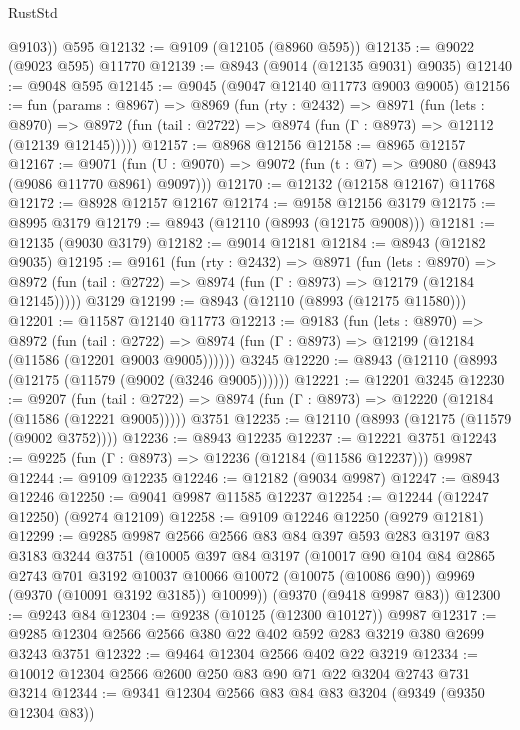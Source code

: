 \begin{lexlean}{RustStd}
\begin{coremodule}
        @9103))
    @595
@12132 := @9109 (@12105 (@8960 @595))
@12135 := @9022 (@9023 @595) @11770
@12139 := @8943 (@9014 (@12135 @9031) @9035)
@12140 := @9048 @595
@12145 := @9045 (@9047 @12140 @11773 @9003 @9005)
@12156 := fun (params : @8967) =>
  @8969
    (fun (rty : @2432) =>
    @8971
      (fun (lets : @8970) =>
      @8972 (fun (tail : @2722) => @8974 (fun (Γ : @8973) => @12112 (@12139 @12145)))))
@12157 := @8968 @12156
@12158 := @8965 @12157
@12167 := @9071
    (fun (U : @9070) => @9072 (fun (t : @7) => @9080 (@8943 (@9086 @11770 @8961) @9097)))
@12170 := @12132 (@12158 @12167) @11768
@12172 := @8928 @12157 @12167
@12174 := @9158 @12156 @3179
@12175 := @8995 @3179
@12179 := @8943 (@12110 (@8993 (@12175 @9008)))
@12181 := @12135 (@9030 @3179)
@12182 := @9014 @12181
@12184 := @8943 (@12182 @9035)
@12195 := @9161
    (fun (rty : @2432) =>
    @8971
      (fun (lets : @8970) =>
      @8972 (fun (tail : @2722) => @8974 (fun (Γ : @8973) => @12179 (@12184 @12145)))))
    @3129
@12199 := @8943 (@12110 (@8993 (@12175 @11580)))
@12201 := @11587 @12140 @11773
@12213 := @9183
    (fun (lets : @8970) =>
    @8972
      (fun (tail : @2722) =>
      @8974 (fun (Γ : @8973) => @12199 (@12184 (@11586 (@12201 @9003 @9005))))))
    @3245
@12220 := @8943 (@12110 (@8993 (@12175 (@11579 (@9002 (@3246 @9005))))))
@12221 := @12201 @3245
@12230 := @9207
    (fun (tail : @2722) => @8974 (fun (Γ : @8973) => @12220 (@12184 (@11586 (@12221 @9005)))))
    @3751
@12235 := @12110 (@8993 (@12175 (@11579 (@9002 @3752))))
@12236 := @8943 @12235
@12237 := @12221 @3751
@12243 := @9225 (fun (Γ : @8973) => @12236 (@12184 (@11586 @12237))) @9987
@12244 := @9109 @12235
@12246 := @12182 (@9034 @9987)
@12247 := @8943 @12246
@12250 := @9041 @9987 @11585 @12237
@12254 := @12244 (@12247 @12250) (@9274 @12109)
@12258 := @9109 @12246 @12250 (@9279 @12181)
@12299 := @9285
    @9987
    @2566
    @2566
    @83
    @84
    @397
    @593
    @283
    @3197
    @83
    @3183
    @3244
    @3751
    (@10005
      @397
      @84
      @3197
      (@10017
        @90
        @104
        @84
        @2865
        @2743
        @701
        @3192
        @10037
        @10066
        @10072
        (@10075 (@10086 @90))
        @9969
        (@9370 (@10091 @3192 @3185))
        @10099))
    (@9370 (@9418 @9987 @83))
@12300 := @9243 @84
@12304 := @9238 (@10125 (@12300 @10127)) @9987
@12317 := @9285 @12304 @2566 @2566 @380 @22 @402 @592 @283 @3219 @380 @2699 @3243 @3751
@12322 := @9464 @12304 @2566 @402 @22 @3219
@12334 := @10012 @12304 @2566 @2600 @250 @83 @90 @71 @22 @3204 @2743 @731 @3214
@12344 := @9341 @12304 @2566 @83 @84 @83 @3204 (@9349 (@9350 @12304 @83))

\end{coremodule}
\end{lexlean}
